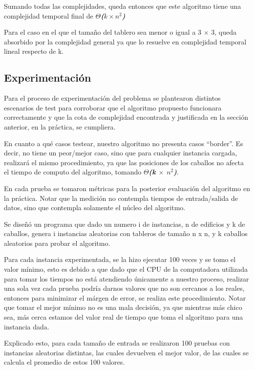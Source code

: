 Sumando todas las complejidades, queda entonces que este algoritmo tiene una complejidad temporal final de \textbf{\textit{$\Theta$($k \times n^2$)}}

Para el caso en el que el tamaño del tablero sea menor o igual a 3 $\times$ 3, queda absorbido por la complejidad general ya que lo resuelve en complejidad temporal lineal respecto de k.
\newpage
\subsection{Experimentación}
Para el proceso de experimentación del problema se plantearon distintos escenarios de test para corroborar que el algoritmo propuesto funcionara correctamente y que la cota de complejidad encontrada y justificada en la sección anterior, en la práctica, se cumpliera.

En cuanto a qué casos testear, nuestro algoritmo no presenta casos “border”. Es decir, no tiene un peor/mejor caso, sino que para cualquier instancia cargada, realizará el mismo procedimiento, ya que las posiciones de los caballos no afecta el tiempo de computo del algoritmo, tomando \textbf{$\Theta$\textit{(k $\times$ $n^2$)}}.

En cada prueba se tomaron métricas para la posterior evaluación del algoritmo en la práctica. Notar que la medición no contempla tiempos de entrada/salida de datos, sino que contempla solamente el núcleo del algoritmo.

Se diseñó un programa que dado un numero i de instancias, n de edificios y k de caballos, genera i instancias aleatorias con tableros de tamaño n x n, y k caballos aleatorios para probar el algoritmo.

Para cada instancia experimentada, se la hizo ejecutar 100 veces y se tomo el valor mínimo, esto es debido a que dado que el CPU de la computadora utilizada para tomar los tiempos no está atendiendo únicamente a nuestro proceso, realizar una sola vez cada prueba podría darnos valores que no son cercanos a los reales, entonces para minimizar el márgen de error, se realiza este procedimiento. Notar que tomar el mejor mínimo no es una mala decisión, ya que mientras más chico sea, más cerca estamos del valor real de tiempo que toma el algoritmo para una instancia dada.

Explicado esto, para cada tamaño de entrada se realizaron 100 pruebas con instancias aleatorias distintas, las cuales devuelven el mejor valor, de las cuales se calcula el promedio de estos 100 valores. 

